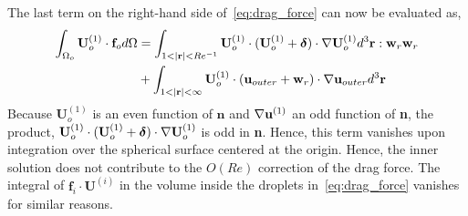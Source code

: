 The last term on the right-hand side of~\ref{eq:drag_force} can now be evaluated as,  
\begin{align}
    \intO[o]{\textbf{U}_{o}^{(1)}\cdot \textbf{f}_{o}}
    &=
    \int_{1<|\textbf{r}|<Re^{-1}}{
    \textbf{U}_{o}^{(1)}\cdot 
    (\textbf{U}_{o}^{(1)} + \bm\delta)\cdot \grad \textbf{U}_{o}^{(1)}
    }d^3\textbf{r}: \textbf{w}_r\textbf{w}_r\\
    &+ 
    \int_{1<|\textbf{r}|<\infty}{
    \textbf{U}_{o}^{(1)}\cdot 
    (\textbf{u}_{outer} + \textbf{w}_r)\cdot \grad \textbf{u}_{outer}
    }d^3\textbf{r} 
    \label{eq:inertial_term_int}
\end{align}
Because $\textbf{U}_o^{(1)}$ is an even function of $\textbf{n}$ and $\mathbf{\nabla} \textbf{u}^{(1)}$ an odd function of \textbf{n}, the product,  
$\textbf{U}_{o}^{(1)}\cdot 
(\textbf{U}_{o}^{(1)} + \bm\delta)\cdot \mathbf{\nabla} \textbf{U}_{o}^{(1)}$ is odd in \textbf{n}. 
Hence, this term vanishes upon integration over the spherical surface centered at the origin. 
Hence, the inner solution does not contribute to the $O(Re)$ correction of the drag force. 
The integral of $\textbf{f}_i \cdot \textbf{U}^{(i)}$ in the volume inside the droplets in~\ref{eq:drag_force} vanishes for similar reasons. 

